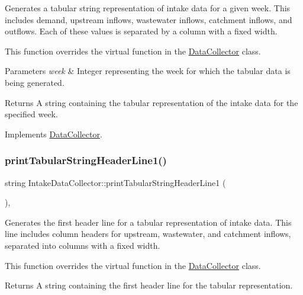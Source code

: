 Generates a tabular string representation of intake data for a given week. This includes demand, upstream inflows, wastewater inflows, catchment inflows, and outflows. Each of these values is separated by a column with a fixed width. 

This function overrides the virtual function in the \mbox{\hyperlink{classDataCollector}{Data\+Collector}} class.


\begin{DoxyParams}{Parameters}
{\em week} & Integer representing the week for which the tabular data is being generated.\\
\hline
\end{DoxyParams}
\begin{DoxyReturn}{Returns}
A string containing the tabular representation of the intake data for the specified week. 
\end{DoxyReturn}


Implements \mbox{\hyperlink{classDataCollector_a397fccabe0223267eea8fc7cac0e59da}{Data\+Collector}}.

\mbox{\label{classIntakeDataCollector_ae17ab7e6c75e77f5981f6a682597bb5c}} 
\subsubsection{\texorpdfstring{print\+Tabular\+String\+Header\+Line1()}{printTabularStringHeaderLine1()}}
{\footnotesize\ttfamily string Intake\+Data\+Collector\+::print\+Tabular\+String\+Header\+Line1 (\begin{DoxyParamCaption}{ }\end{DoxyParamCaption})\hspace{0.3cm}{\ttfamily [override]}, {\ttfamily [virtual]}}



Generates the first header line for a tabular representation of intake data. This line includes column headers for upstream, wastewater, and catchment inflows, separated into columns with a fixed width. 

This function overrides the virtual function in the \mbox{\hyperlink{classDataCollector}{Data\+Collector}} class.

\begin{DoxyReturn}{Returns}
A string containing the first header line for the tabular representation. 
\end{DoxyReturn}


